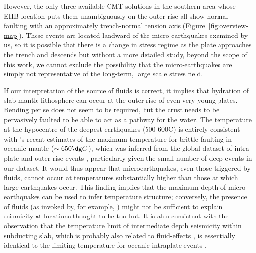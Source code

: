 \documentclass[reviewcopy]{elsarticle}
\begin{document}
However, the only three available CMT solutions in the southern area whose
EHB location puts them unambiguously on the outer rise
 all show normal faulting with an
approximately trench-normal tension axis
(Figure~\ref{fig:overview-map}). These events are located landward
of the micro-earthquakes examined by us, so it is possible that there
is a change in stress regime as the plate approaches the trench and
descends but without a more detailed study, beyond the scope of
this work, we cannot exclude the possibility that the
micro-earthquakes are simply not representative of the long-term, large
scale stress field.

If our interpretation of the source of fluids is correct, it implies that hydration of slab
mantle lithosphere can occur at the outer rise of even very young
plates. Bending per se does not seem to be required, but the crust
needs to be pervasively faulted to be able to act as a pathway for the
water.     The temperature at the hypocentre of the deepest earthquakes
 (500-600\dg C) is entirely consistent with \citeauthor{mckenzie05}'s
 \citeyearpar{mckenzie05} recent estimates of the maximum temperature
 for brittle faulting in oceanic mantle ($\sim 650\dg C$), which was  inferred from the global
 dataset of intra-plate and outer rise events \citep{wiens83},
 particularly given the small number of deep events in our dataset.
 It would thus appear that microearthquakes, even those triggered by
 fluids, cannot occur at temperatures substantially higher than those
 at which large earthquakes occur.  This finding implies that the
 maximum depth of micro-earthquakes can be used to infer temperature
 structure; conversely, the presence of fluids (as invoked by, for example,
 \citealp{reyners07}) might not be
 sufficient to explain seismicity at locations thought to
 be too hot.
 It is also consistent with the observation that the
 temperature limit of intermediate depth seismicity within subducting slab, which is probably
 also related to fluid-effects \citep[e.g.]{peacock01}, is essentially
 identical to the limiting temperature for oceanic intraplate events \citep{emmerson07}.
\end{document}
